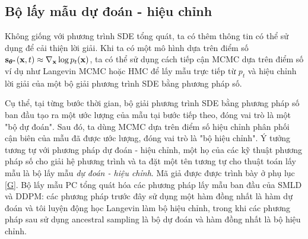 \documentclass{article} %
\begin{document}
\subsection{Bộ lấy mẫu dự đoán - hiệu chỉnh}

Không giống với phương trình SDE tổng quát, ta có thêm thông tin có thể sử dụng để cải thiện lời giải.
Khi ta có một mô hình dựa trên điểm số $\bold{s}_{\boldsymbol{\theta}^{\ast}} (\bold{x}, t)\approx \nabla_{\bold{x}} \log p_t (\bold{x})$, ta có thể sử dụng cách tiếp cận MCMC dựa trên điểm số ví dụ như Langevin MCMC \citep{parisi1981correlation,grenander1994representations} hoặc HMC \citep{neal2011mcmc} để lấy mẫu trực tiếp từ $p_t$ và hiệu chỉnh lời giải của một bộ giải phương trình SDE bằng phương pháp số.

Cụ thể, tại từng bước thời gian, bộ giải phương trình SDE bằng phương pháp số ban đầu tạo ra một ước lượng của mẫu tại bước tiếp theo, đóng vai trò là một "bộ dự đoán".
Sau đó, ta dùng MCMC dựa trên điểm số hiệu chỉnh phân phối cận biên của mẫu đã được ước lượng, đóng vai trò là "bộ hiệu chỉnh".
Ý tưởng tương tự với phương pháp dự đoán - hiệu chỉnh, một họ của các kỹ thuật phương pháp số cho giải hệ phương trình \citep{allgower2012numerical} và ta đặt một tên tương tự cho thuật toán lấy mẫu là bộ lấy mẫu \textit{dự đoán - hiệu chỉnh}.
Mã giả được được trình bày ở phụ lục \ref{G}.
Bộ lấy mẫu PC tổng quát hóa các phương pháp lấy mẫu ban đầu của SMLD và DDPM: các phương pháp trước đây sử dụng một hàm đồng nhất là hàm dự đoán và tôi luyện động học Langevin làm bộ hiệu chỉnh, trong khi các phương pháp sau sử dụng ancestral sampling là bộ dự đoán và hàm đồng nhất là bộ hiệu chỉnh.
\end{document}
